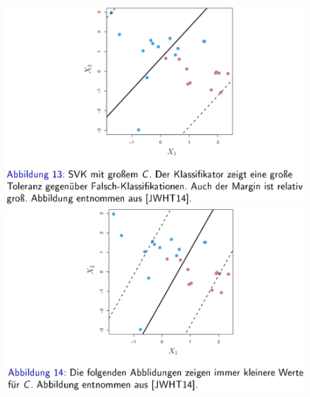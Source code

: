 \documentclass{report}
\begin{document}
  \begin{figure}[H]	
    \centering	
    \begin{minipage}[b]{0.4\textwidth}	
      \includegraphics[scale=.265]{ml06_13}	
    \end{minipage}	
    \hfill	
    \begin{minipage}[b]{0.4\textwidth}	
      \includegraphics[scale=.275]{ml06_14}	
    \end{minipage}	
  \end{figure}	
  
\end{document}
